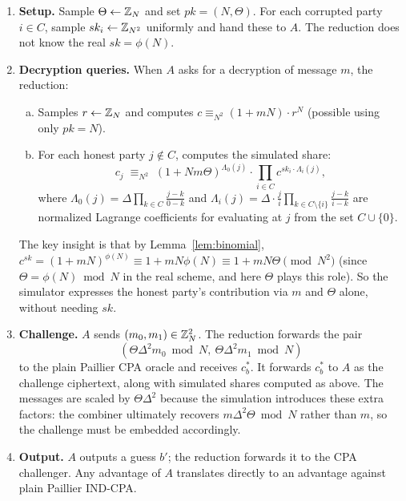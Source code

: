\begin{enumerate}
  \item \textbf{Setup.} Sample $\Theta \leftarrow \mathbb{Z}_N$ and set $pk = (N, \Theta)$.
    For each corrupted party $i \in C$, sample $sk_i \leftarrow \mathbb{Z}_{N^2}$ uniformly and
    hand these to $A$. The reduction does not know the real $sk = \phi(N)$.

  \item \textbf{Decryption queries.} When $A$ asks for a decryption of message $m$, the
    reduction:
    \begin{enumerate}[(a)]
      \item Samples $r \leftarrow \mathbb{Z}_N$ and computes $c \equiv_{N^2} (1+mN) \cdot r^N$
        (possible using only $pk = N$).
      \item For each honest party $j \notin C$, computes the simulated share:
        \[
          c_j \;\equiv_{N^2}\;
          (1 + Nm\Theta)^{\Lambda_0(j)} \cdot \prod_{i \in C} c^{sk_i \cdot \Lambda_i(j)},
        \]
        where $\Lambda_0(j) = \Delta \prod_{k \in C} \frac{j-k}{0-k}$ and
        $\Lambda_i(j) = \Delta \cdot \frac{j}{i} \prod_{k \in C \setminus \{i\}} \frac{j-k}{i-k}$
        are normalized Lagrange coefficients for evaluating at $j$ from the set $C \cup \{0\}$.
    \end{enumerate}
    The key insight is that by Lemma~\ref{lem:binomial},
    $c^{sk} = (1+mN)^{\phi(N)} \equiv 1 + mN\phi(N) \equiv 1 + mN\Theta \pmod{N^2}$
    (since $\Theta = \phi(N) \bmod N$ in the real scheme, and here $\Theta$ plays this role).
    So the simulator expresses the honest party's contribution via $m$ and $\Theta$ alone,
    without needing $sk$.

  \item \textbf{Challenge.} $A$ sends $(m_0, m_1) \in \mathbb{Z}_N^2$. The reduction forwards the pair
    \[
      (\Theta\Delta^2 m_0 \bmod N,\ \Theta\Delta^2 m_1 \bmod N)
    \]
    to the plain Paillier CPA oracle and receives $c_b^*$. It forwards $c_b^*$ to $A$ as the challenge ciphertext,
    along with simulated shares computed as above. The messages are scaled by $\Theta\Delta^2$
    because the simulation introduces these extra factors: the combiner ultimately recovers
    $m\Delta^2\Theta \bmod N$ rather than $m$, so the challenge must be embedded accordingly.

  \item \textbf{Output.} $A$ outputs a guess $b'$; the reduction forwards it to the CPA
    challenger. Any advantage of $A$ translates directly to an advantage against plain
    Paillier IND-CPA.
\end{enumerate}

